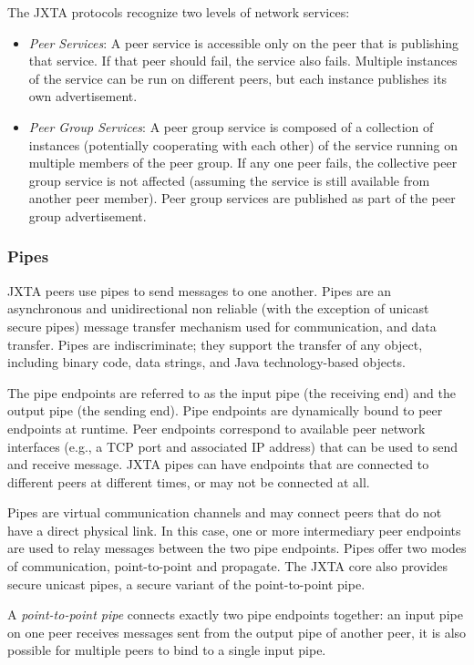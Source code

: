 The JXTA protocols recognize two levels of network services:
\begin{itemize}
 \item \emph{Peer Services}: A peer service is accessible only on the peer that is publishing that service. If that peer should fail, the service also fails. Multiple instances of the service can be run on different peers, but each instance publishes its own advertisement. 
 \item \emph{Peer Group Services}: A peer group service is composed of a collection of instances (potentially cooperating with each other) of the service running on multiple members of the peer group. If any one peer fails, the collective peer group service is not affected (assuming the service is still available from another peer member). Peer group services are published as part of the peer group advertisement. 
\end{itemize}

\subsubsection{Pipes}
JXTA peers use pipes to send messages to one another. Pipes are an asynchronous and unidirectional non reliable (with the exception of unicast secure pipes) message transfer mechanism used for communication, and data transfer. Pipes are indiscriminate; they support the transfer of any object, including binary code, data strings, and Java technology-based objects. 

The pipe endpoints are referred to as the input pipe (the receiving end) and the output pipe (the sending end). Pipe endpoints are dynamically bound to peer endpoints at runtime. Peer endpoints correspond to available peer network interfaces (e.g., a TCP port and associated IP address) that can be used to send and receive message. JXTA pipes can have endpoints that are connected to different peers at different times, or may not be connected at all. 

Pipes are virtual communication channels and may connect peers that do not have a direct physical link. In this case, one or more intermediary peer endpoints are used to relay messages between the two pipe endpoints. Pipes offer two modes of communication, point-to-point and propagate. The JXTA core also provides secure unicast pipes, a secure variant of the point-to-point pipe. 

A \emph{point-to-point pipe} connects exactly two pipe endpoints together: an input pipe on one peer receives messages sent from the output pipe of another peer, it is also possible for multiple peers to bind to a single input pipe. 

